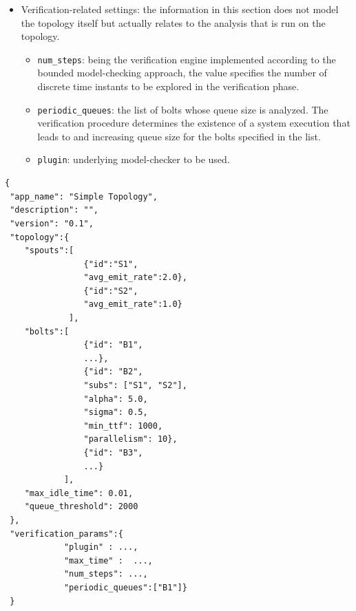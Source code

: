 {\begin{itemize}
\begin{itemize}
		\item \texttt{max\_idle\_time}: the maximum time for a bolt to be inactive.
	\end{itemize}
	\item Verification-related settings: the information in this section does not model the topology itself but actually relates to the analysis that is run on the topology. 
	\begin{itemize}
		\item \texttt{num\_steps}: being the verification engine implemented according to the bounded model-checking approach, the value specifies the number of discrete time instants to be explored in the verification phase.
		\item \texttt{periodic\_queues}: the list of bolts whose queue size is analyzed. The verification procedure determines the existence of a system execution that leads to and increasing queue size for the bolts specified in the list.	
		\item \texttt{plugin}: underlying model-checker to be used.
	\end{itemize}
\end{itemize}

\begin{lstlisting}[basicstyle=\normalfont\ttfamily\small,tabsize=12,caption=JSON script describing a simple topology. Dots are used as abbreviations.]
{
 "app_name": "Simple Topology",
 "description": "",
 "version": "0.1",
 "topology":{
	"spouts":[
	            {"id":"S1",
	            "avg_emit_rate":2.0},
	            {"id":"S2",
	            "avg_emit_rate":1.0}
	         ],
	"bolts":[
	            {"id": "B1",
	            ...},
	            {"id": "B2",
	            "subs": ["S1", "S2"],
	            "alpha": 5.0,
	            "sigma": 0.5,
	            "min_ttf": 1000,
	            "parallelism": 10},
	            {"id": "B3",
	            ...}
	        ],
	"max_idle_time": 0.01,
	"queue_threshold": 2000
 },
 "verification_params":{
            "plugin" : ...,
            "max_time" :  ...,
            "num_steps": ...,
            "periodic_queues":["B1"]}
 }
\end{lstlisting}\label{lst:json-format}
}
